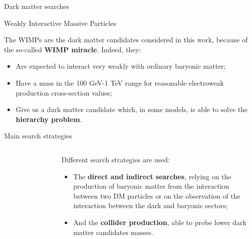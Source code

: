 \documentclass[8pt]{beamer}
\begin{document}
\begin{frame}{Dark matter searches}
\justifying

\vspace{5pt}
\begin{block}{ \centering Weakly Interactive Massive Particles}\end{block} \vfill
The \alert{WIMPs are the dark matter candidates} considered in this work, because of the so-called \textbf{WIMP miracle}. Indeed, they:

\begin{itemize}
\justifying
\item Are expected to interact very weakly with ordinary baryonic matter;
\item Have a mass in the 100 GeV-1 TeV range for reasonable electroweak production cross-section values;
\item Give us a dark matter candidate which, in some models, is able to solve the \textbf{hierarchy problem}.
\end{itemize} \vfill

\vspace{5pt}
\begin{block}{ \centering Main search strategies}\end{block} \vfill

\begin{columns}
	\begin{column}{0.45\textwidth}
\begin{figure}[htbp]
\begin{center}
\begin{figure}[htbp]
\begin{center}
\includegraphics[width=4.2cm, height=3.5cm]{figs/ThreeWays.png}
\end{center}
\end{figure}
\end{center}
\end{figure}
\end{column}
\begin{column}{0.54\textwidth}
\alert{Different search strategies} are used:

\begin{itemize}
\justifying
\item The \textbf{direct and indirect searches}, relying on the production of baryonic
matter from the interaction between two DM particles or on the observation of the interaction
between the dark and baryonic sectors;
\item And the \textbf{collider production}, able to probe lower dark matter candidates masses.
\end{itemize}

\end{column}
\end{columns} \vfill
\end{frame}
\end{document}
